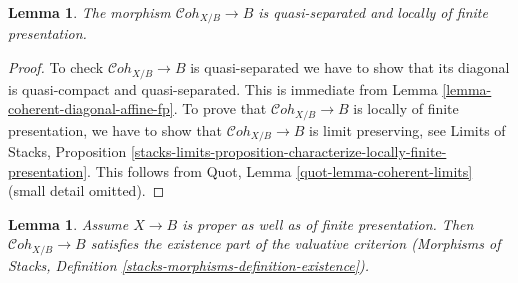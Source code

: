 \documentclass{stacks-project}
\theoremstyle{plain}
\newtheorem{lemma}[subsection]{Lemma}
\theoremstyle{definition}
\theoremstyle{remark}
\numberwithin{equation}{subsection}
\def\Cohstack{\mathcal{C}\!\mathit{oh}}
\begin{document}
\begin{lemma}
\label{lemma-coherent-qs-lfp}
The morphism $\Cohstack_{X/B} \to B$ is quasi-separated and
locally of finite presentation.
\end{lemma}

\begin{proof}
To check $\Cohstack_{X/B} \to B$ is quasi-separated we have to
show that its diagonal is quasi-compact and quasi-separated.
This is immediate from Lemma \ref{lemma-coherent-diagonal-affine-fp}.
To prove that $\Cohstack_{X/B} \to B$ is locally of finite
presentation, we have to show that $\Cohstack_{X/B} \to B$
is limit preserving, see
Limits of Stacks, Proposition
\ref{stacks-limits-proposition-characterize-locally-finite-presentation}.
This follows from Quot, Lemma \ref{quot-lemma-coherent-limits}
(small detail omitted).
\end{proof}

\begin{lemma}
\label{lemma-coherent-existence-part}
Assume $X \to B$ is proper as well as of finite presentation.
Then $\Cohstack_{X/B} \to B$ satisfies the existence part
of the valuative criterion (Morphisms of Stacks, Definition
\ref{stacks-morphisms-definition-existence}).
\end{lemma}
\end{document}
